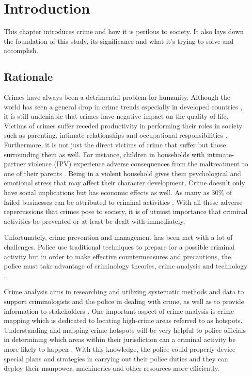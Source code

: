 \chapter{Introduction}
    This chapter introduces crime and how it is perilous to society. It also lays down the foundation of this study, its significance and what it's trying to solve and accomplish.
\section{Rationale}

    Crimes have always been a detrimental problem for humanity. Although the world has seen a general drop in crime trends especially in developed countries \citep{dijk2007criminal}, it is still undeniable that crimes have negative impact on the quality of life. Victims of crimes suffer receded productivity in performing their roles in society such as parenting, intimate relationships and occupational responsibilities \citep{hanson2010impact}. Furthermore, it is not just the direct victims of crime that suffer but those surrounding them as well. For instance, children in households with intimate-partner violence (IPV) experience adverse consequences from the maltreatment to one of their parents \citep{casanueva2008quality}. Being in a violent household gives them psychological and emotional stress that may affect their character development. Crime doesn’t only have social implications but has economic effects as well. As many as 30\% of failed businesses can be attributed to criminal activities \citep{bressler2009impact}. With all these adverse repercussions that crimes pose to society, it is of utmost importance that criminal activities be prevented or at least be dealt with immediately.

    Unfortunately, crime prevention and management has been met with a lot of challenges. Police use traditional techniques to prepare for a possible criminal activity but in order to make effective countermeasures and precautions, the police must take advantage of criminology theories, crime analysis and technology \citep{polat2007spatio}.

    Crime analysis aims in researching and utilizing systematic methods and data to support criminologists and the police in dealing with crime, as well as to provide information to stakeholders \citep{santos2012crime}. One important aspect of crime analysis is crime mapping which is dedicated to locating high-crime areas referred to as hotspots. Understanding and mapping crime hotspots will be very helpful to police officials in determining which areas within their jurisdiction can a criminal activity be more likely to happen \citep{eck2005mapping}. With this knowledge, the police could properly device special plans and strategies in carrying out their police duties and they can deploy their manpower, machineries and other resources more efficiently.

